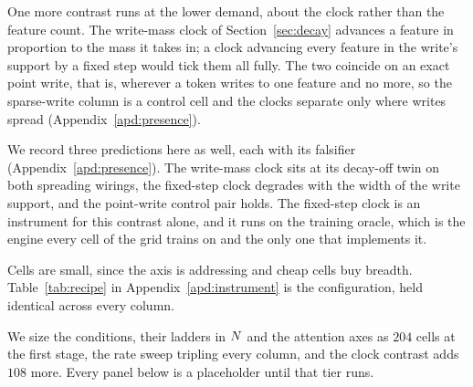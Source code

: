 One more contrast runs at the lower demand, about the clock rather than the feature count. The write-mass clock of Section~\ref{sec:decay} advances a feature in proportion to the mass it takes in; a clock advancing every feature in the write's support by a fixed step would tick them all fully. The two coincide on an exact point write, that is, wherever a token writes to one feature and no more, so the sparse-write column is a control cell and the clocks separate only where writes spread (Appendix~\ref{apd:presence}).

We record three predictions here as well, each with its falsifier (Appendix~\ref{apd:presence}). The write-mass clock sits at its decay-off twin on both spreading wirings, the fixed-step clock degrades with the width of the write support, and the point-write control pair holds. The fixed-step clock is an instrument for this contrast alone, and it runs on the training oracle, which is the engine every cell of the grid trains on and the only one that implements it.

Cells are small, since the axis is addressing and cheap cells buy breadth. Table~\ref{tab:recipe} in Appendix~\ref{apd:instrument} is the configuration, held identical across every column.

We size the conditions, their ladders in $N$ and the attention axes as $204$ cells at the first stage, the rate sweep tripling every column, and the clock contrast adds $108$ more. Every panel below is a placeholder until that tier runs.


